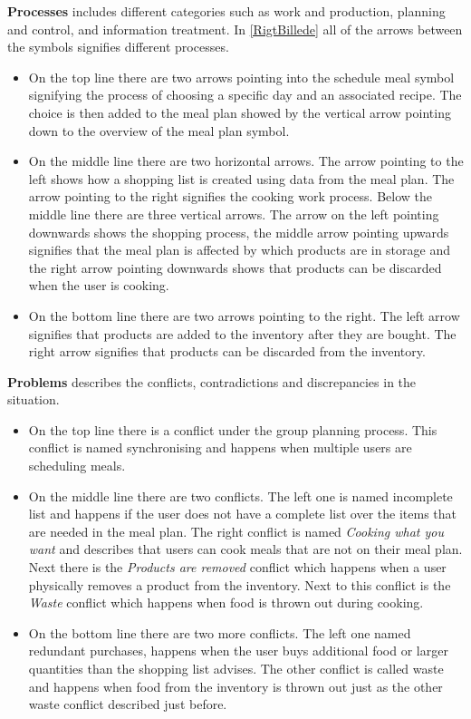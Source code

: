 \textbf{Processes} includes different categories such as work and production, planning and control, and information treatment. In \cref{RigtBillede} all of the arrows between the symbols signifies different processes.
\begin{itemize}
\item On the top line there are two arrows pointing into the schedule meal symbol signifying the process of choosing a specific day and an associated recipe. The choice is then added to the meal plan showed by the vertical arrow pointing down to the overview of the meal plan symbol. 

\item On the middle line there are two horizontal arrows. The arrow pointing to the left shows how a shopping list is created using data from the meal plan. The arrow pointing to the right signifies the cooking work process. Below the middle line there are three vertical arrows. The arrow on the left pointing downwards shows the shopping process, the middle arrow pointing upwards signifies that the meal plan is affected by which products are in storage and the right arrow pointing downwards shows that products can be discarded when the user is cooking. 

\item On the bottom line there are two arrows pointing to the right. The left arrow signifies that products are added to the inventory after they are bought. The right arrow signifies that products can be discarded from the inventory.            
\end{itemize}

\textbf{Problems} describes the conflicts, contradictions and discrepancies in the situation.
\begin{itemize}
\item On the top line there is a conflict under the group planning process. This conflict is named synchronising and happens when multiple users are scheduling meals. 

\item On the middle line there are two conflicts. The left one is named incomplete list and happens if the user does not have a complete list over the items that are needed in the meal plan. The right conflict is named \textit{Cooking what you want} and describes that users can cook meals that are not on their meal plan. Next there is the \textit{Products are removed} conflict which happens when a user physically removes a product from the inventory. Next to this conflict is the \textit{Waste} conflict which happens when food is thrown out during cooking.  

\item On the bottom line there are two more conflicts. The left one named redundant purchases, happens when the user buys additional food or larger quantities than the shopping list advises. The other conflict is called waste and happens when food from the inventory is thrown out just as the other waste conflict described just before.           
\end{itemize}


